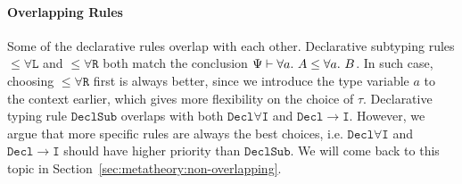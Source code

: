 \paragraph{Overlapping Rules}
Some of the declarative rules overlap with each other.
Declarative subtyping rules $\mathtt{{\le}\forall L}$ and $\mathtt{{\le}\forall R}$
both match the conclusion $\Psi\vdash \all A \le \all B$.
In such case, choosing $\mathtt{{\le}\forall R}$ first is always better,
since we introduce the type variable $a$ to the context earlier,
which gives more flexibility on the choice of $\tau$.
Declarative typing rule $\mathtt{DeclSub}$ overlaps with
both $\mathtt{Decl\forall I}$ and $\mathtt{Decl{\to}I}$.
However, we argue that more specific rules are always the best choices,
i.e. $\mathtt{Decl\forall I}$ and $\mathtt{Decl{\to}I}$ should have
higher priority than $\mathtt{DeclSub}$. We will come back to this
topic in Section~\ref{sec:metatheory:non-overlapping}.
\begin{comment}
For example, $\Psi\vdash \lam x \Lto \all a\to a$ succeeds if derived from
Rule $\mathtt{Decl\forall I}$, but fails when applied to $\mathtt{DeclSub}$:
$$
\inferrule*[right={$\mathtt{Decl\forall I}$}]
	{\inferrule*[Right={$\mathtt{Decl\to I}$}]
		{\Psi,a,x:a \vdash x \Lto a}
		{\Psi,a \vdash \lam x \Lto a \to a}
	}
	{\Psi\vdash \lam x \Lto \all a \to a}
$$
$$
\inferrule*[right={$\mathtt{DeclSub}$}]
	{
		\inferrule*[right=$\mathtt{Decl\to I\To}$]
			{\Psi \vdash \blue\sigma\to \blue\tau \quad \Psi,x:\blue\sigma\vdash e \Lto \blue\tau}
			{\Psi \vdash \lam x \To \blue\sigma\to \blue\tau}\quad
		\inferrule*[Right=$\mathtt{{\le}\forall R}$]
			{\inferrule*[Right=$\mathtt{{\le}{\to}}$]
				{
					\inferrule*[Right=$?$]
						{\text{Impossible! }\blue\sigma \neq a}
						{\Psi,a \vdash a \le \blue\sigma}
					\quad \Psi,a \vdash \blue\tau \le a
				}
				{\Psi,a \vdash \blue\sigma\to \blue\tau \le a \to a}
			}
			{\Psi\vdash \blue\sigma\to \blue\tau\le \all a \to a}
	}
{\Psi\vdash \lam x \Lto \all a \to a}
$$

Rule $\mathtt{Decl\to I}$ is also better at handling higher-order types.
When the lambda-expression to be inferred has a polymorphic input type,
such as $\all a \to a$,
$\mathtt{DeclSub}$ may not derive some judgments.
For example, $\Psi,id:\all a\to a \vdash \lam[f] f~id~(f~()) \Lto (\all a\to a) \to 1$
requires the argument of the lambda-expression to be a polymorphic type,
otherwise it could not be applied to both $id$ and $()$.
If Rule $\mathtt{DeclSub}$ was chosen for derivation,
the type of its argument is restricted by Rule $\mathtt{Decl\to I\To}$,
which is not a polymorphic type.
By contrast,
Rule $\mathtt{Decl\to I}$ keeps the polymorphic argument type $\all a\to a$,
and will successfully derive the judgment.
\end{comment}


